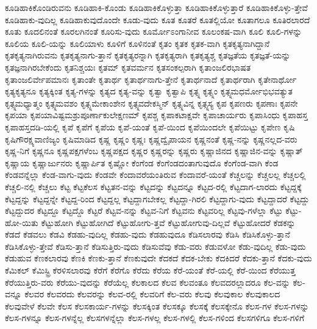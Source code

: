 {ಕೂಡಿಹಾಕಿಕೊಂಡಿರುವನು
ಕೂಡಿಹಾಕಿ-ಕೊಂಡು
ಕೂಡಿಹಾಕಿಕೊಳ್ಳುತ್ತಾ
ಕೂಡಿಹಾಕಿಕೊಳ್ಳುತ್ತಾರೆ
ಕೂಡಿಹಾಕಿಕೊಳ್ಳು-ತ್ತೇವೆ
ಕೂಡಿಹಾಕು-ವುದಿಲ್ಲ
ಕೂಡಿಹಾಕುವುದೊಂದೇ
ಕೂಡು-ವುದು
ಕೂತ
ಕೂತರೆ
ಕೂತಲ್ಲಿಯೋ
ಕೂತಾಗಲೂ
ಕೂತಿರಲಾರದೆ
ಕೂತು
ಕೂದಲಿನಂತೆ
ಕೂರಲಗಿನಂತೆ
ಕೂರಿಸು-ವುದು
ಕೂರ್ಮೋಽಂಗಾನೀವ
ಕೂಲಂಕಷ-ವಾಗಿ
ಕೂಲಿ
ಕೂಲಿ-ಗಳನ್ನು
ಕೂಲಿಯ
ಕೂಲಿ-ಯನ್ನು
ಕೂಲಿಯಾಳು
ಕೂಳಿಗೆ
ಕೂಳಿನಂತೆ
ಕೃತಂ
ಕೃತಕ
ಕೃತಕ-ವಾಗಿ
ಕೃತಕೃತ್ಯನಾಗಿದ್ದಾನೆ
ಕೃತಕೃತ್ಯನಾಗಿರುವನು
ಕೃತಕೃತ್ಯನಾಗು-ತ್ತಾನೆ
ಕೃತಕೃತ್ಯರನ್ನಾಗಿ
ಕೃತಕೃತ್ಯರಾಗಿ
ಕೃತಕೃತ್ಯಶ್ಚ
ಕೃತಜ್ಞತೆಯ
ಕೃತಜ್ಞತೆ-ಯನ್ನು
ಕೃತಜ್ಞನಾಗಿರಬೇಕೆಂದು
ಕೃತನಿಶ್ಚಯಃ
ಕೃತಮ್
ಕೃತವರ್ಮನ
ಕೃತಸಂಕಲ್ಪರಾಗಿ
ಕೃತಾಂಜಲಿರಭಾಷತ
ಕೃತಾಂಜಲಿರ್ವೇಪಮಾನಃ
ಕೃತಾಂತೇ
ಕೃತಾರ್ಥ
ಕೃತಾರ್ಥನಾಗು-ತ್ತೇನೆ
ಕೃತಾರ್ಥನಾದೆ
ಕೃತಾರ್ಥರಾಗಿ
ಕೃತೇನಾರ್ಥೋ
ಕೃತ್ಯಕೃತ್ಯನೂ
ಕೃತ್ಯಕ್ಕಿಂತ
ಕೃತ್ಯ-ಗಳನ್ನು
ಕೃತ್ಯದ
ಕೃತ್ಯ-ವನ್ನು
ಕೃತ್ವಾ
ಕೃತ್ವಾಪಿ
ಕೃತ್ಸ್ನ
ಕೃತ್ಸ್ನಂ
ಕೃತ್ಸ್ನಮಧರ್ಮೋಭಿಭವತ್ಯುತ
ಕೃತ್ಸ್ನಮಧ್ಯಾತ್ಮಂ
ಕೃತ್ಸ್ನಮವಶಂ
ಕೃತ್ಸ್ನಮೇಕಾಂಶೇನ
ಕೃತ್ಸ್ನವದೇಕಸ್ಮಿನ್
ಕೃತ್ಸ್ನವಿನ್ನ
ಕೃತ್ಸ್ನಸ್ಯ
ಕೃಪ
ಕೃಪಣರು
ಕೃಪಣಾಃ
ಕೃಪನೇ
ಕೃಪಯಾ
ಕೃಪಯಾವಿಷ್ಟಮಶ್ರುಪೂರ್ಣಾಕುಲೇಕ್ಷಣಮ್
ಕೃಪಶ್ಚ
ಕೃಪಾಕಟಾಕ್ಷವೇ
ಕೃಪಾಚಾರ್ಯರು
ಕೃಪಾಸಿಂಧು
ಕೃಪಾಹಸ್ತ
ಕೃಪಾಹಸ್ತದಡಿ-ಯಲ್ಲಿ
ಕೃಪೆ
ಕೃಪೆಗೆ
ಕೃಪೆಯ
ಕೃಪೆ-ಯಂತೆ
ಕೃಪೆ-ಯಿಂದ
ಕೃಪೆಯಿಂದಲೇ
ಕೃಪೆಯಿಟ್ಟು
ಕೃಪೇಣ
ಕೃಷಿ
ಕೃಷಿಗೌರಕ್ಷ್ಯವಾಣಿಜ್ಯಂ
ಕೃಷಿಮಾಡಿದ
ಕೃಷ್ಣ
ಕೃಷ್ಣಂ
ಕೃಷ್ಣಃ
ಕೃಷ್ಣದ್ವೈಪಾಯನ
ಕೃಷ್ಣನಂತೆ
ಕೃಷ್ಣ-ನನ್ನು
ಕೃಷ್ಣನಲ್ಲದ-ವರು
ಕೃಷ್ಣ-ನಿಗೆ
ಕೃಷ್ಣನೂ
ಕೃಷ್ಣಪಕ್ಷಗಳೆಂಬ
ಕೃಷ್ಣಪಕ್ಷದ
ಕೃಷ್ಣರ
ಕೃಷ್ಣರನ್ನು
ಕೃಷ್ಣರು
ಕೃಷ್ಣಾಜಿನದ
ಕೃಷ್ಣಾಜಿನ-ವನ್ನು
ಕೃಷ್ಣಾತ್
ಕೃಷ್ಣಾಯ
ಕೃಷ್ಣಾರ್ಜುನರು
ಕೃಷ್ಣಾರ್ಪಿತ
ಕೃಷ್ಣೋ
ಕೆಂಗೆಂಡ
ಕೆಂಗೆಂಡದಂತಾಗುವುದೊ
ಕೆಂಗೆಂಡ-ವಾಗಿ
ಕೆಂಡ
ಕೆಂಡವನ್ನೆಲ್ಲಾ
ಕೆಂಡ-ವಾಗು-ವುದು
ಕೆಂಡವೇ
ಕೆಂದಾವರೆಯಂತಿರುವ
ಕೆಂದಾವರೆ-ಯಂತೆ
ಕೆಚ್ಚಲನ್ನು
ಕೆಚ್ಚಲಲ್ಲ
ಕೆಚ್ಚಲಲ್ಲಿ
ಕೆಚ್ಚಲಿ-ನಲ್ಲಿ
ಕೆಚ್ಚಲು
ಕೆಟ್ಟ
ಕೆಟ್ಟಕೆಲಸ
ಕೆಟ್ಟತನ-ವನ್ನು
ಕೆಟ್ಟದನ್ನು
ಕೆಟ್ಟದನ್ನೂ
ಕೆಟ್ಟದ-ರಲ್ಲಿ
ಕೆಟ್ಟದಾಗ-ಲಾರದು
ಕೆಟ್ಟದ್ದಕ್ಕೆ
ಕೆಟ್ಟದ್ದನ್ನು
ಕೆಟ್ಟದ್ದನ್ನೇ
ಕೆಟ್ಟದ್ದ-ರಿಂದ
ಕೆಟ್ಟದ್ದಲ್ಲ
ಕೆಟ್ಟದ್ದಾಗಬೇಕಲ್ಲ
ಕೆಟ್ಟದ್ದಾ-ಗಿರಲಿ
ಕೆಟ್ಟದ್ದಾಗು-ವುದು
ಕೆಟ್ಟದ್ದಾದರೆ
ಕೆಟ್ಟದ್ದು
ಕೆಟ್ಟದ್ದುದರ
ಕೆಟ್ಟದ್ದೂ
ಕೆಟ್ಟದ್ದೊ
ಕೆಟ್ಟರೆ
ಕೆಟ್ಟವ-ನನ್ನು
ಕೆಟ್ಟವ-ನಿಗೆ
ಕೆಟ್ಟವನು
ಕೆಟ್ಟವರಿಲ್ಲ
ಕೆಟ್ಟವು-ಗಳೆಲ್ಲಾ
ಕೆಟ್ಟು
ಕೆಟ್ಟು-ಹೋ-ಯಿತು
ಕೆಟ್ಟುಹೋಗಿ
ಕೆಟ್ಟುಹೋಗಿದೆ
ಕೆಟ್ಟುಹೋಗು-ತ್ತವೆ
ಕೆಟ್ಟುಹೋಗುವು-ದಿಲ್ಲವೆ
ಕೆಟ್ಟುಹೋದರೆ
ಕೆಡಕನ್ನು
ಕೆಡದೆ
ಕೆಡವಲು
ಕೆಡವಿ
ಕೆಡಹು-ವುದಿಲ್ಲ
ಕೆಡಹು-ವುದು
ಕೆಡಹುವುದೂ
ಕೆಡಿಸಲಾರವು
ಕೆಡಿಸಿ
ಕೆಡಿಸಿಕೊಳ್ಳು-ತ್ತಾನೆ
ಕೆಡಿಸಿಕೊಳ್ಳು-ತ್ತೇವೆ
ಕೆಡಿಸು-ತ್ತಾನೆ
ಕೆಡಿಸುತ್ತಿರು-ವುದು
ಕೆಡಿಸುವೆವು
ಕೆಡು-ವರು
ಕೆಡುವಳೋ
ಕೆಡು-ವುದಿಲ್ಲ
ಕೆಡು-ವುದು
ಕೆಡುಹುವ
ಕೆಣಕಲಾರವು
ಕೆಣಕಿ
ಕೆಣಕು-ತ್ತಾನೆ
ಕೆಣಕುವುದೇ
ಕೆದಕದೆ
ಕೆದಕ-ಬೇಕು
ಕೆದಕಿದರೆ
ಕೆದಕು-ತ್ತಾನೆ
ಕೆದಕು-ವುದು
ಕೆಮಿಕಲ್
ಕೆಮಿಸ್ಟ್ರಿ
ಕೆರಳಿಸಲಾರವು
ಕೆರೆಗೆ
ಕೆರೆಗೊ
ಕೆರೆದು
ಕೆರೆಯ
ಕೆರೆ-ಯಂತೆ
ಕೆರೆ-ಯಲ್ಲಿ
ಕೆರೆ-ಯಿಂದ
ಕೆರೆಯುತ್ತ
ಕೆರೆಯುತ್ತಿರು-ವರು
ಕೆರೆಯು-ವುದನ್ನು
ಕೆರೆಯೆಲ್ಲ
ಕೆಲಕಾಲದ
ಕೆಲವ
ಕೆಲವಂತೂ
ಕೆಲವದರಲ್ಲಾದರೂ
ಕೆಲ-ವನ್ನು
ಕೆಲ-ವನ್ನೂ
ಕೆಲವರ
ಕೆಲವರದು
ಕೆಲವರನ್ನು
ಕೆಲವ-ರಲ್ಲಿ
ಕೆಲವರಿಗೆ
ಕೆಲ-ವರು
ಕೆಲವು
ಕೆಲವುಕಾಲ
ಕೆಲವುಕಾಲದ
ಕೆಲವುವೇಳೆ
ಕೆಲವೇ
ಕೆಲಸ
ಕೆಲಸಕಾರ್ಯ-ಗಳನ್ನು
ಕೆಲಸಕ್ಕಿಂತ
ಕೆಲಸಕ್ಕೂ
ಕೆಲಸಕ್ಕೆ
ಕೆಲಸಕ್ಕೇನೊ
ಕೆಲಸ-ಗಳ
ಕೆಲಸ-ಗಳನ್ನು
ಕೆಲಸ-ಗಳನ್ನೂ
ಕೆಲಸ-ಗಳನ್ನೆಲ್ಲ
ಕೆಲಸಗಳನ್ನೆಲ್ಲಾ
ಕೆಲಸ-ಗಳಲ್ಲ
ಕೆಲಸ-ಗಳಲ್ಲಿ
ಕೆಲಸ-ಗಳಿಂದ
ಕೆಲಸಗಳಿಗೂ
ಕೆಲಸ-ಗಳಿಗೆ
}
